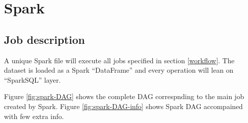 \chapter{Spark}

\section{Job description}

A unique Spark file will execute all jobs specified in section \ref{workflow}. The dataset is loaded as a Spark ``DataFrame'' and every operation will lean on ``SparkSQL'' layer.

Figure \ref{fig:spark-DAG} shows the complete DAG correspnding to the main job created by Spark. Figure \ref{fig:spark-DAG-info} shows Spark DAG accompained with few extra info.

